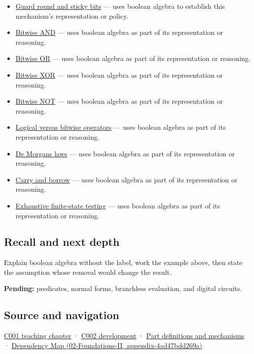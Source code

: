\begin{itemize}
\item
  \hyperref[appendix-b572b631069b]{Guard round and sticky bits} --- uses boolean algebra to establish this mechanism's representation or policy.
\item
  \hyperref[appendix-68b52453737c]{Bitwise AND} --- uses boolean algebra as part of its representation or reasoning.
\item
  \hyperref[appendix-a427ce8ce8a6]{Bitwise OR} --- uses boolean algebra as part of its representation or reasoning.
\item
  \hyperref[appendix-d49161831368]{Bitwise XOR} --- uses boolean algebra as part of its representation or reasoning.
\item
  \hyperref[appendix-8f38927cfc54]{Bitwise NOT} --- uses boolean algebra as part of its representation or reasoning.
\item
  \hyperref[appendix-fe6b457d68d8]{Logical versus bitwise operators} --- uses boolean algebra as part of its representation or reasoning.
\item
  \hyperref[appendix-9079d3659da4]{De Morgan\textquotesingle s laws} --- uses boolean algebra as part of its representation or reasoning.
\item
  \hyperref[appendix-d52d5f78ffd1]{Carry and borrow} --- uses boolean algebra as part of its representation or reasoning.
\item
  \hyperref[appendix-05db24ccc28a]{Exhaustive finite-state testing} --- uses boolean algebra as part of its representation or reasoning.
\end{itemize}

\subsection{Recall and next depth}\label{appendix-24475e1596a8-recall-and-next-depth}

Explain boolean algebra without the label, work the example above, then state the assumption whose removal would change the result.

\textbf{Pending:} predicates, normal forms, branchless evaluation, and digital circuits.

\subsection{Source and navigation}\label{appendix-24475e1596a8-source-and-navigation}

\hyperref[01-foundations-i-ch001-from-a-signal-to-an-interpretation]{C001 teaching chapter} · \hyperref[01-foundations-i-ch001-arithmetic-becomes-a-policy]{C002 development} · \hyperref[appendix-fd090d982a15]{Part definitions and mechanisms} · \href{../02-Foundations-II/main.pdf\#nameddest=appendix-4ad47bdd269a}{Dependency Map (02-Foundations-II, appendix-4ad47bdd269a)}
